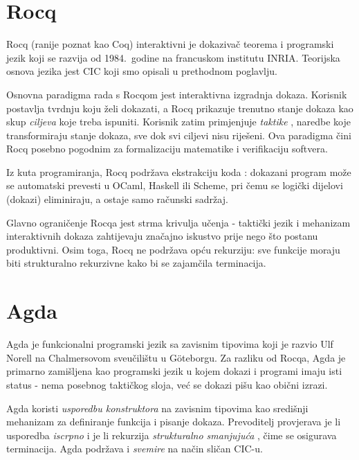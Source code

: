 \documentclass[diplomskirad,upload]{fer}
\begin{document}
\section{Rocq}

Rocq (ranije poznat kao Coq) \cite{rocq} interaktivni je dokazivač teorema i
programski jezik koji se razvija od 1984.\ godine na francuskom institutu INRIA.
Teorijska osnova jezika jest CIC koji smo opisali u prethodnom poglavlju.

Osnovna paradigma rada s Rocqom jest interaktivna izgradnja dokaza. Korisnik
postavlja tvrdnju koju želi dokazati, a Rocq prikazuje trenutno stanje dokaza
kao skup \emph{ciljeva}  koje treba ispuniti. Korisnik zatim
primjenjuje \emph{taktike} , naredbe koje transformiraju stanje
dokaza, sve dok svi ciljevi nisu riješeni. Ova paradigma čini Rocq posebno
pogodnim za formalizaciju matematike i verifikaciju softvera.

Iz kuta programiranja, Rocq podržava ekstrakciju koda :
dokazani program može se automatski prevesti u OCaml, Haskell ili Scheme, pri
čemu se logički dijelovi (dokazi) eliminiraju, a ostaje samo računski sadržaj.

Glavno ograničenje Rocqa jest strma krivulja učenja - taktički jezik i
mehanizam interaktivnih dokaza zahtijevaju značajno iskustvo prije nego što
postanu produktivni. Osim toga, Rocq ne podržava opću rekurziju: sve funkcije
moraju biti strukturalno rekurzivne kako bi se zajamčila terminacija.

\section{Agda}

Agda \cite{agda} je funkcionalni programski jezik sa zavisnim tipovima
koji je razvio Ulf Norell na Chalmersovom sveučilištu u Göteborgu. Za razliku
od Rocqa, Agda je primarno zamišljena kao programski jezik u kojem dokazi i
programi imaju isti status - nema posebnog taktičkog sloja, već se dokazi
pišu kao obični izrazi.

Agda koristi \emph{usporedbu konstruktora}  na
zavisnim tipovima kao središnji mehanizam za definiranje funkcija i pisanje
dokaza. Prevoditelj provjerava je li usporedba \emph{iscrpno}
 i je li rekurzija \emph{strukturalno smanjujuća}
, čime se osigurava terminacija. Agda podržava i
\emph{svemire}  na način sličan CIC-u.
\end{document}
